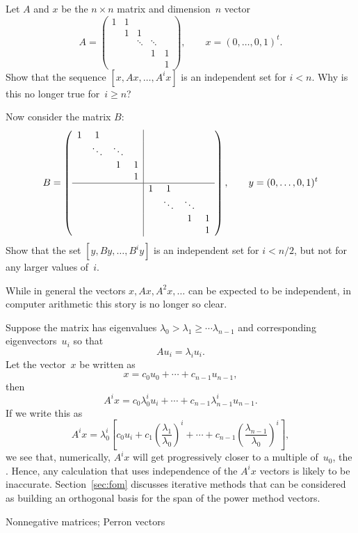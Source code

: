 \begin{exercise}
  Let $A$ and $x$ be the $n\times n$ matrix and dimension~$n$ vector
  \[ 
  A = \begin{pmatrix}
    1&1\\ &1&1\\ &&\ddots&\ddots\\ &&&1&1\\&&&&1
  \end{pmatrix},\qquad
  x =  (0,\ldots,0,1)^t.
  \]
  Show that the sequence $[x,Ax,\ldots,A^ix]$ is an independent set
  for $i<n$. Why is this no longer true for~$i\geq n$?

  Now consider the matrix $B$:
  \[ B=\left(
  \begin{array}{cccc|cccc}
    1&1&&\\ &\ddots&\ddots&\\ &&1&1\\ &&&1\\ \hline
    &&&&1&1\\ &&&&&\ddots&\ddots\\ &&&&&&1&1\\ &&&&&&&1
  \end{array}\right),\qquad
  y = (0,\ldots,0,1)^t
  \]
  Show that the set $[y,By,\ldots,B^iy]$ is an independent set for
  $i<n/2$, but not for any larger values of~$i$.
\end{exercise}

While in general the vectors $x,Ax,A^2x,\ldots$ can be expected to be
independent, in computer arithmetic this story is no longer so clear.

Suppose the matrix has eigenvalues $\lambda_0>\lambda_1\geq\cdots
\lambda_{n-1}$ and corresponding eigenvectors~$u_i$ so that
\[ Au_i=\lambda_i u_i. \]
Let the vector~$x$ be written as
\[ x=c_0u_0+\cdots +c_{n-1}u_{n-1}, \]
then 
\[ A^ix = c_0\lambda_0^iu_i+\cdots +c_{n-1}\lambda_{n-1}^iu_{n-1}. \]
If we write this as 
\[ A^ix = \lambda_0^i\left[
    c_0u_i+c_1\left(\frac{\lambda_1}{\lambda_0}\right)^i+
    \cdots +c_{n-1}\left(\frac{\lambda_{n-1}}{\lambda_0}\right)^i
    \right],
\]
we see that, numerically, $A^ix$ will get progressively closer
to a multiple of~$u_0$, the .
Hence,
any calculation that uses independence of the $A^ix$ vectors is likely
to be inaccurate.
Section~\ref{sec:fom} discusses iterative methods that can be considered
as building an orthogonal basis for the span of the power method vectors.

 {Nonnegative matrices; Perron vectors}
\label{app:perron}

